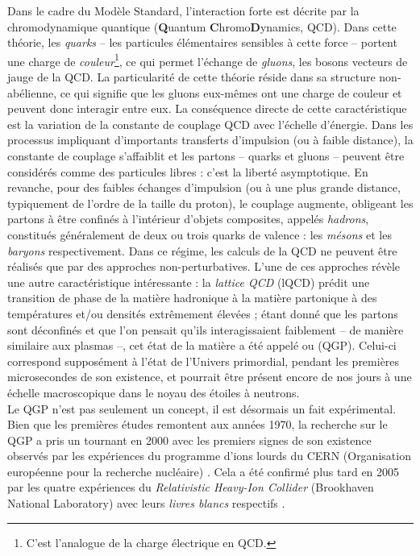 Dans le cadre du Modèle Standard, l'interaction forte est décrite par la chromodynamique quantique (\textbf{Q}uantum \textbf{C}hromo\textbf{D}ynamics, QCD). Dans cette théorie, les \textit{quarks} -- les particules élémentaires sensibles à cette force -- portent une charge de \textit{couleur}\footnote{C'est l'analogue de la charge électrique en QCD.}, ce qui permet l'échange de \textit{gluons}, les bosons vecteurs de jauge de la QCD. La particularité de cette théorie réside dans sa structure non-abélienne, ce qui signifie que les gluons eux-mêmes ont une charge de couleur et peuvent donc interagir entre eux. La conséquence directe de cette caractéristique est la variation de la constante de couplage QCD avec l'échelle d'énergie. Dans les processus impliquant d'importants transferts d'impulsion (ou à faible distance), la constante de couplage s'affaiblit et les partons -- quarks et gluons -- peuvent être considérés comme des particules libres : c'est la liberté asymptotique. En revanche, pour des faibles échanges d'impulsion (ou à une plus grande distance, typiquement de l'ordre de la taille du proton), le couplage augmente, obligeant les partons à être confinés à l'intérieur d'objets composites, appelés \textit{hadrons}, constitués généralement de deux ou trois quarks de valence : les \textit{mésons} et les \textit{baryons} respectivement. Dans ce régime, les calculs de la QCD ne peuvent être réalisés que par des approches non-perturbatives. L'une de ces approches révèle une autre caractéristique intéressante : la  \textit{lattice QCD} (lQCD) prédit une transition de phase de la matière hadronique à la matière partonique à des températures et/ou densités extrêmement élevées ; étant donné que les partons sont déconfinés et que l'on pensait qu'ils interagissaient faiblement -- de manière similaire aux plasmas --, cet état de la matière a été appelé  ou  (QGP). Celui-ci correspond supposément à l'état de l'Univers primordial, pendant les premières microsecondes de son existence, et pourrait être présent encore de nos jours à une échelle macroscopique dans le noyau des étoiles à neutrons.\\

Le QGP n'est pas seulement un concept, il est désormais un fait expérimental. Bien que les premières études remontent aux années 1970, la recherche sur le QGP a pris un tournant en 2000 avec les premiers signes de son existence observés par les expériences du programme d'ions lourds du CERN (Organisation européenne pour la recherche nucléaire) \cite{cernNewStateMatter2023}. Cela a été confirmé plus tard en 2005 par les quatre expériences du \textit{Relativistic Heavy-Ion Collider} (Brookhaven National Laboratory) avec leurs \textit{livres blancs} respectifs \cite{ludlamHUNTINGQUARKGLUON2005, arseneQuarkGluonPlasma2005, backPHOBOSPerspectiveDiscoveries2005, phenixcollaborationFormationDensePartonic2005, starcollaborationExperimentalTheoreticalChallenges2005}.

